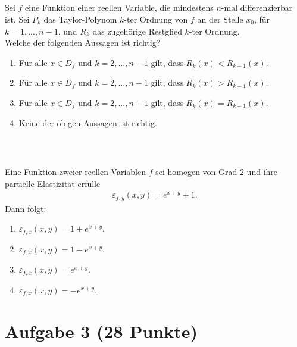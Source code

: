 \subsection*{}
Sei $ f $ eine Funktion einer reellen Variable, die mindestens $ n $-mal differenzierbar ist.
Sei $ P_k $ das Taylor-Polynom $ k $-ter Ordnung von $ f $ an der Stelle $ x_0 $, für $ k = 1,...,n-1 $, und $ R_k $ das zugehörige Restglied $ k $-ter Ordnung.\\
Welche der folgenden Aussagen ist richtig? 
\renewcommand{\labelenumi}{(\alph{enumi})}
\begin{enumerate}
	\item 
	Für alle $ x \in D_f $ und $  k = 2,...,n-1 $ gilt,
	dass $ R_k(x) < R_{k-1}(x) $.
	\item
	Für alle $ x \in D_f $ und $  k = 2,...,n-1 $ gilt,
	dass $ R_k(x) > R_{k-1}(x) $.
	
	\item
	Für alle $ x \in D_f $ und $  k = 2,...,n-1 $ gilt,
	dass $ R_k(x) = R_{k-1}(x) $.
	\item
	Keine der obigen Aussagen ist richtig.
\end{enumerate}
\ \\
\subsection*{}
Eine Funktion zweier reellen Variablen $ f $ sei homogen von Grad $ 2 $ und ihre partielle Elastizität erfülle 
\begin{align*}
	\varepsilon_{f,y}(x,y) = e^{x+y} +1. 
\end{align*}
Dann folgt:
\renewcommand{\labelenumi}{(\alph{enumi})}
\begin{enumerate}
	\item 
	$ 	\varepsilon_{f,x}(x,y)  = 1 + e^{x+y}$.
	\item
	$ 	\varepsilon_{f,x}(x,y)  = 1 - e^{x+y}$.
	
	\item
	$ 	\varepsilon_{f,x}(x,y)  =  e^{x+y}$.
	\item
	$ 	\varepsilon_{f,x}(x,y)  = - e^{x+y}$.
\end{enumerate}
\newpage
\section*{Aufgabe 3 (28 Punkte)}
\vspace{0.4cm}

